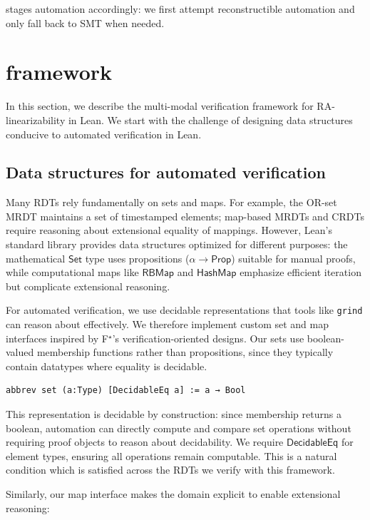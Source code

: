 \documentclass[sigplan,twocolumn,accept]{acmart}
\newcommand{\F}[1]{\mathsf{#1}}
\newcommand{\fstar}{F$^{\star}$\xspace}
\begin{document}
\sal stages automation accordingly: we first attempt reconstructible automation and only fall back to SMT when needed.


\section{\sal framework}

In this section, we describe the \sal multi-modal verification framework for RA-linearizability in Lean. We start with the challenge of designing data structures conducive to automated verification in Lean.

\subsection{Data structures for automated verification}
\label{sec:data_structures}

Many RDTs rely fundamentally on sets and maps. For example, the OR-set MRDT maintains a set of timestamped elements; map-based MRDTs and CRDTs require reasoning about extensional equality of mappings. However, Lean's standard library provides data structures optimized for different purposes: the mathematical $\F{Set}$ type uses propositions ($\alpha \to \F{Prop}$) suitable for manual proofs, while computational maps like $\F{RBMap}$ and $\F{HashMap}$ emphasize efficient iteration but complicate extensional reasoning.

For automated verification, we use decidable representations that tools like \texttt{grind} can reason about effectively. We therefore implement custom set and map interfaces inspired by \fstar's verification-oriented designs. Our sets use boolean-valued membership functions rather than propositions, since they typically contain datatypes where equality is decidable.

\begin{lstlisting}[language=lean]
abbrev set (a:Type) [DecidableEq a] := a → Bool
\end{lstlisting}

This representation is decidable by construction: since membership returns a boolean, automation can directly compute and compare set operations without requiring proof objects to reason about decidability. We require $\F{DecidableEq}$ for element types, ensuring all operations remain computable. This is a natural condition which is satisfied across the RDTs we verify with this framework.

Similarly, our map interface makes the domain explicit to enable extensional reasoning:
\end{document}
